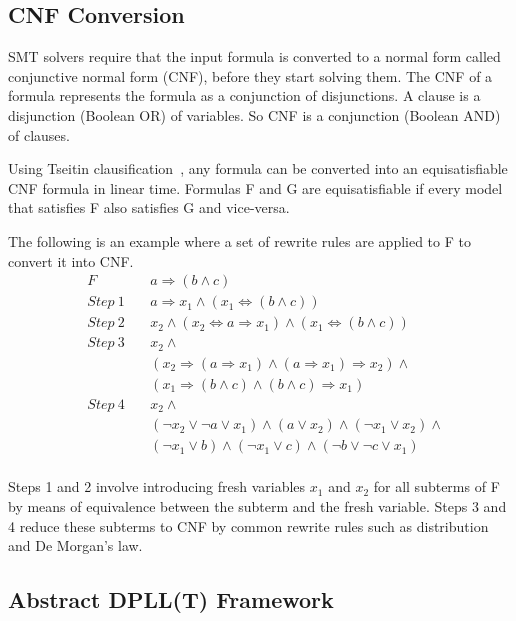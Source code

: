 \documentclass{article}
\begin{document}
\subsection{CNF Conversion}
\label{sec:cnf}
SMT solvers require that the input formula is converted to a 
normal form called conjunctive normal form (CNF), before they 
start solving them. The CNF of a formula represents the 
formula as a conjunction of disjunctions. A clause is a 
disjunction (Boolean OR) of variables. So CNF is a 
conjunction (Boolean AND) of clauses. 

Using Tseitin clausification~\cite{BEL01Handbook}, any formula 
can be converted into an equisatisfiable CNF formula 
in linear time. Formulas F and G are equisatisfiable if 
every model that satisfies F also satisfies G and vice-versa.

The following is an example where a set of rewrite rules
are applied to F to convert it into CNF. 
\begin{align*}
	&F&\ &a \Rightarrow (b \land c) \\
	&Step\ 1&\ &a \Rightarrow x_1 
		\land (x_1 \iff (b \land c)) \\
	&Step\ 2&\ &x_2 \land (x_2 \iff a \Rightarrow x_1) 
		\land (x_1 \iff (b \land c)) \\
	&Step\ 3&\ &x_2 \land \\
	& & &(x_2 \Rightarrow (a \Rightarrow x_1) \land 
		(a \Rightarrow x_1) \Rightarrow x_2) \land \\
	& & &(x_1 \Rightarrow (b \land c) \land 
		(b \land c) \Rightarrow x_1) \\
	&Step\ 4&\ &x_2 \land \\
	& & &(\neg x_2 \lor \neg a \lor x_1) \land 
		(a \lor x_2) \land (\neg x_1 \lor x_2) \land \\
	& & &(\neg x_1 \lor b) \land (\neg x_1 \lor c) \land 
		(\neg b \lor \neg c \lor x_1) \\
\end{align*}

Steps 1 and 2 involve introducing fresh variables $x_1$
and $x_2$ for all subterms of F by means of equivalence 
between the subterm and the fresh variable. Steps 3 and 4 
reduce these subterms to CNF by common rewrite rules 
such as distribution and De Morgan's law.


\subsection{Abstract DPLL(T) Framework}
\label{sec:trans}
\end{document}
